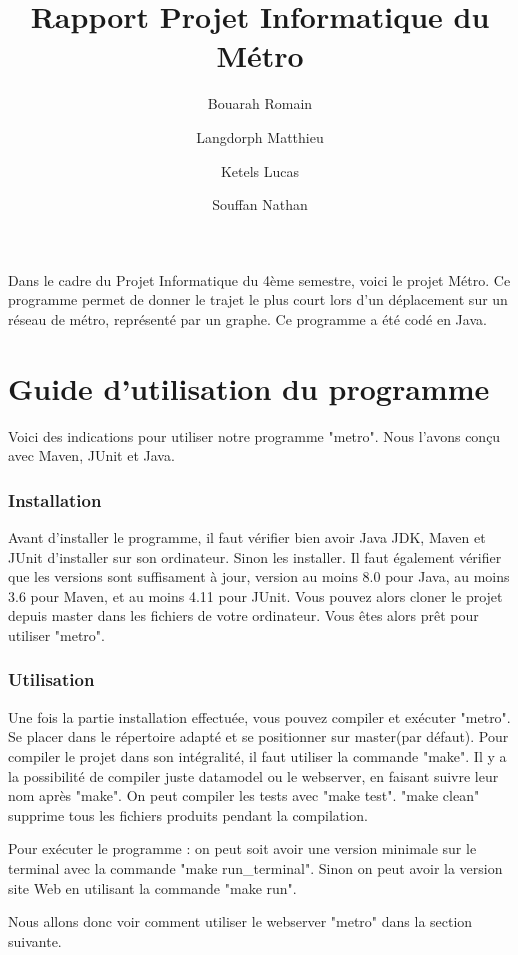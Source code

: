 \documentclass[12pt,french]{article}
\title{Rapport Projet Informatique du Métro}
\author{
  Bouarah Romain \and
  Langdorph Matthieu \and
  Ketels Lucas \and
  Souffan Nathan
}
\begin{document}
\maketitle

Dans le cadre du Projet Informatique du 4ème semestre, voici le projet Métro. Ce programme permet de donner le trajet le plus court lors d'un déplacement sur un réseau de métro, représenté par un graphe. Ce programme a été codé en Java.  
\newpage
\tableofcontents

 
\newpage

\part{Guide d'utilisation du programme}
Voici des indications pour utiliser notre programme "metro". Nous l'avons conçu avec Maven, JUnit et Java.

\section{Installation}
Avant d'installer le programme, il faut vérifier bien avoir Java JDK, Maven et JUnit d'installer sur son ordinateur. Sinon les installer. Il faut également vérifier que les versions sont suffisament à jour, version au moins 8.0 pour Java, au moins 3.6 pour Maven, et au moins 4.11 pour JUnit.
Vous pouvez alors cloner le projet depuis master dans les fichiers de votre ordinateur.
Vous êtes alors prêt pour utiliser "metro".

\section{Utilisation}
Une fois la partie installation effectuée, vous pouvez compiler et exécuter "metro".
Se placer dans le répertoire adapté et se positionner sur master(par défaut).
Pour compiler le projet dans son intégralité, il faut utiliser la commande "make".
Il y a la possibilité de compiler juste datamodel ou le webserver, en faisant suivre leur nom après "make".
On peut compiler les tests avec "make test".
"make clean" supprime tous les fichiers produits pendant la compilation.

Pour exécuter le programme : on peut soit avoir une version minimale sur le terminal avec la commande "make run\_terminal". Sinon on peut avoir la version site Web en utilisant la commande "make run".

Nous allons donc voir comment utiliser le webserver "metro" dans la section suivante.
\end{document}
